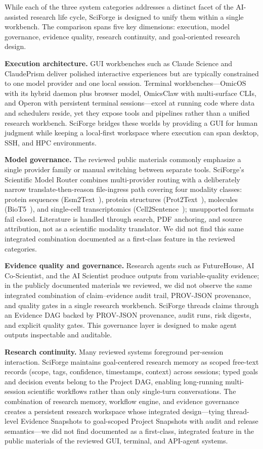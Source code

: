 \documentclass[sn-basic,Numbered,pdflatex]{sn-jnl}
\begin{document}
While each of the three system categories addresses a distinct facet of the AI-assisted research life cycle, SciForge is designed to unify them within a single workbench. The comparison spans five key dimensions: execution, model governance, evidence quality, research continuity, and goal-oriented research design.

\textbf{Execution architecture.} GUI workbenches such as Claude Science and ClaudePrism deliver polished interactive experiences but are typically constrained to one model provider and one local session. Terminal workbenches---OmicOS with its hybrid daemon plus browser model, OmicsClaw with multi-surface CLIs, and Operon with persistent terminal sessions---excel at running code where data and schedulers reside, yet they expose tools and pipelines rather than a unified research workbench. SciForge bridges these worlds by providing a GUI for human judgment while keeping a local-first workspace where execution can span desktop, SSH, and HPC environments.

\textbf{Model governance.} The reviewed public materials commonly emphasize a single provider family or manual switching between separate tools. SciForge's Scientific Model Router combines multi-provider routing with a deliberately narrow translate-then-reason file-ingress path covering four modality classes: protein sequences (Esm2Text~\cite{abdine2023prot2text}), protein structures (Prot2Text~\cite{abdine2023prot2text}), molecules (BioT5~\cite{pei2024biot5}), and single-cell transcriptomics (Cell2Sentence~\cite{rizvi2025c2s}); unsupported formats fail closed. Literature is handled through search, PDF anchoring, and source attribution, not as a scientific modality translator. We did not find this same integrated combination documented as a first-class feature in the reviewed categories.

\textbf{Evidence quality and governance.} Research agents such as FutureHouse, AI Co-Scientist, and the AI Scientist produce outputs from variable-quality evidence; in the publicly documented materials we reviewed, we did not observe the same integrated combination of claim--evidence audit trail, PROV-JSON provenance, and quality gates in a single research workbench. SciForge threads claims through an Evidence DAG backed by PROV-JSON provenance, audit runs, risk digests, and explicit quality gates. This governance layer is designed to make agent outputs inspectable and auditable.

\textbf{Research continuity.} Many reviewed systems foreground per-session interaction. SciForge maintains goal-centered research memory as scoped free-text records (scope, tags, confidence, timestamps, context) across sessions; typed goals and decision events belong to the Project DAG, enabling long-running multi-session scientific workflows rather than only single-turn conversations. The combination of research memory, workflow engine, and evidence governance creates a persistent research workspace whose integrated design---tying thread-level Evidence Snapshots to goal-scoped Project Snapshots with audit and release semantics---we did not find documented as a first-class, integrated feature in the public materials of the reviewed GUI, terminal, and API-agent systems.
\end{document}
